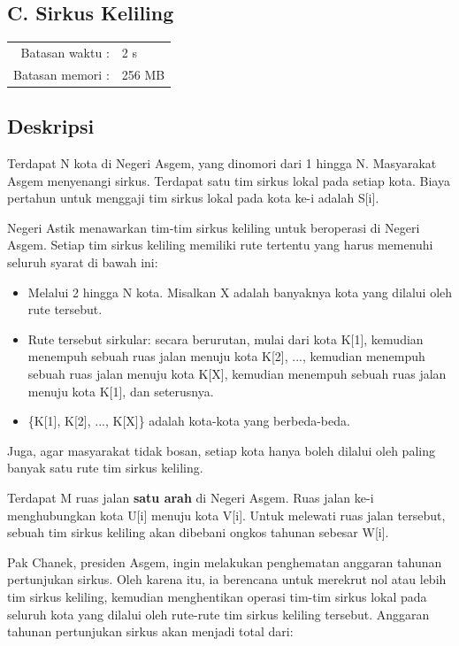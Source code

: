 \documentclass[../main_problemset.tex]{subfiles} %
\newcommand{\problemName}{C. Sirkus Keliling}
\newcommand{\problemTL}{2 s}
\newcommand{\problemML}{256 MB}
\begin{document}
\begin{center}
    \section*{\problemName}
    \addcontentsline{toc}{section}{\problemName} %
    
    \begin{tabular}{rl}
    Batasan waktu : & \problemTL \\
    Batasan memori : & \problemML
    \end{tabular}
\end{center}

\subsection*{Deskripsi}

Terdapat N kota di Negeri Asgem, yang dinomori dari 1 hingga N. Masyarakat Asgem menyenangi sirkus. Terdapat satu tim sirkus lokal pada setiap kota. Biaya pertahun untuk menggaji tim sirkus lokal pada kota ke-i adalah S[i].

Negeri Astik menawarkan tim-tim sirkus keliling untuk beroperasi di Negeri Asgem. Setiap tim sirkus keliling memiliki rute tertentu yang harus memenuhi seluruh syarat di bawah ini:

\begin{itemize}
	\item Melalui 2 hingga N kota. Misalkan X adalah banyaknya kota yang dilalui oleh rute tersebut.
	\item Rute tersebut sirkular: secara berurutan, mulai dari kota K[1], kemudian menempuh sebuah ruas jalan menuju kota K[2], ..., kemudian menempuh sebuah ruas jalan menuju kota K[X], kemudian menempuh sebuah ruas jalan menuju kota K[1], dan seterusnya.
	\item \{K[1], K[2], ..., K[X]\} adalah kota-kota yang berbeda-beda.
\end{itemize}

Juga, agar masyarakat tidak bosan, setiap kota hanya boleh dilalui oleh paling banyak satu rute tim sirkus keliling.

Terdapat M ruas jalan \textbf{satu arah} di Negeri Asgem. Ruas jalan ke-i menghubungkan kota U[i] menuju kota V[i]. Untuk melewati ruas jalan tersebut, sebuah tim sirkus keliling akan dibebani ongkos tahunan sebesar W[i].

Pak Chanek, presiden Asgem, ingin melakukan penghematan anggaran tahunan pertunjukan sirkus. Oleh karena itu, ia berencana untuk merekrut nol atau lebih tim sirkus keliling, kemudian menghentikan operasi tim-tim sirkus lokal pada seluruh kota yang dilalui oleh rute-rute tim sirkus keliling tersebut. Anggaran tahunan pertunjukan sirkus akan menjadi total dari:
\end{document}
